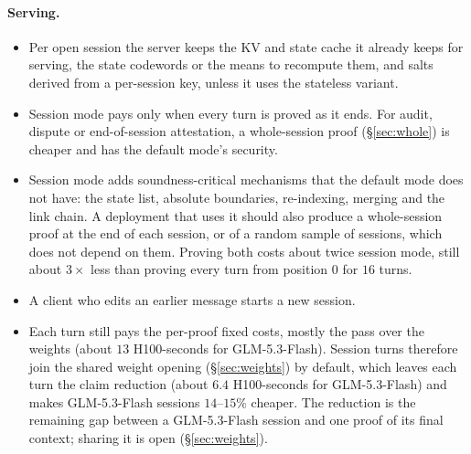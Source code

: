 \documentclass[11pt]{article}
\begin{document}
\paragraph{Serving.}
\begin{itemize}
\item Per open session the server keeps the KV and state cache it already keeps for serving, the state codewords or the means to recompute them, and salts derived from a per-session key, unless it uses the stateless variant.
\item Session mode pays only when every turn is proved as it ends. For audit, dispute or end-of-session attestation, a whole-session proof (\S\ref{sec:whole}) is cheaper and has the default mode's security.
\item Session mode adds soundness-critical mechanisms that the default mode does not have: the state list, absolute boundaries, re-indexing, merging and the link chain. A deployment that uses it should also produce a whole-session proof at the end of each session, or of a random sample of sessions, which does not depend on them. Proving both costs about twice session mode, still about \(3\times\) less than proving every turn from position \(0\) for \(16\) turns.
\item A client who edits an earlier message starts a new session.
\item Each turn still pays the per-proof fixed costs, mostly the pass over the weights (about \(13\) H100-seconds for GLM-5.3-Flash). Session turns therefore join the shared weight opening (\S\ref{sec:weights}) by default, which leaves each turn the claim reduction (about \(6.4\) H100-seconds for GLM-5.3-Flash) and makes GLM-5.3-Flash sessions \(14\)--\(15\%\) cheaper. The reduction is the remaining gap between a GLM-5.3-Flash session and one proof of its final context; sharing it is open (\S\ref{sec:weights}).
\end{itemize}
\end{document}
